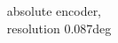 \documentclass{beamer}
\begin{document}
\begin{frame}
\begin{columns}
\begin{column}{0.5\textwidth}
    \end{column}

    \begin{column}{0.5\textwidth}
      absolute encoder, \\ resolution 0.087deg \\
    \end{column}

  \end{columns}

\end{frame}
\end{document}
